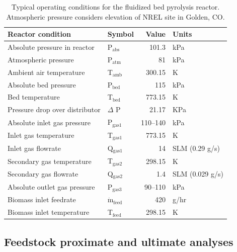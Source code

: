 \begin{table}[H]
    \centering
    \caption{Typical operating conditions for the fluidized bed pyrolysis reactor. Atmospheric pressure considers elevation of NREL site in Golden, CO.}
    \label{tab:operating}
    \begin{tabular}{llrl}
        \toprule
        Reactor condition & Symbol & Value & Units \\
        \midrule
        Absolute pressure in reactor   & P$_{\textrm{abs}}$  & 101.3     & kPa \\
        Atmospheric pressure           & P$_{\textrm{atm}}$  & 81        & kPa \\
        Ambient air temperature        & T$_{\textrm{amb}}$  & 300.15    & K \\
        Absolute bed pressure          & P$_{\textrm{bed}}$  & 115       & kPa  \\
        Bed temperature                & T$_{\textrm{bed}}$  & 773.15    & K \\
        Pressure drop over distributor & $\Delta$ P          & 21.17     & KPa \\
        Absolute inlet gas pressure    & P$_{\textrm{gas1}}$ & 110--140  & kPa \\
        Inlet gas temperature          & T$_{\textrm{gas1}}$ & 773.15    & K \\
        Inlet gas flowrate             & Q$_{\textrm{gas1}}$ & 14        & SLM (0.29 g/s) \\
        Secondary gas temperature      & T$_{\textrm{gas2}}$ & 298.15    & K \\
        Secondary gas flowrate         & Q$_{\textrm{gas2}}$ & 1.4       & SLM (0.029 g/s) \\
        Absolute outlet gas pressure   & P$_{\textrm{gas3}}$ & 90--110   & kPa \\
        Biomass inlet feedrate         & $\dot{{\textrm{m}}}_{\textrm{feed}}$ & 420 & g/hr \\
        Biomass inlet temperature      & T$_{\textrm{feed}}$ & 298.15    & K \\
        \bottomrule
    \end{tabular}
\end{table}

\subsection{Feedstock proximate and ultimate analyses}

